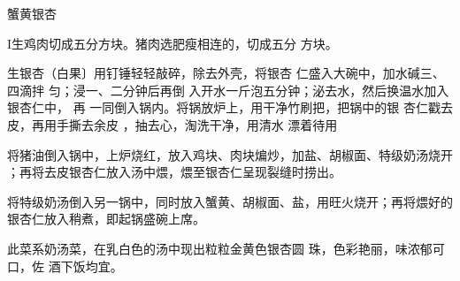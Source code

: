 \begin{recipe}{蟹黄银杏}

\ingredients



\cooking

I生鸡肉切成五分方块。猪肉选肥瘦相连的，切成五分 方块。

生银杏（白果〕用钉锤轻轻敲碎，除去外壳，将银杏 仁盛入大碗中，加水碱三、四滴拌
匀；浸一、二分钟后再倒 入开水一斤泡五分钟；泌去水，然后换温水加入银杏仁中， 再
一同倒入锅内。将锅放炉上，用干净竹刷把，把锅中的银 杏仁戳去皮，再用手撕去余皮
，抽去心，淘洗干净，用清水 漂着待用

\step 将猪油倒入锅中，上炉烧红，放入鸡块、肉块煸炒，加盐、胡椒面、特级奶汤烧开
；再将去皮银杏仁放入汤中煨，煨至银杏仁呈现裂缝时捞出。

\step 将特级奶汤倒入另一锅中，同时放入蟹黄、胡椒面、盐，用旺火烧开；再将煨好的
银杏仁放入稍煮，即起锅盛碗上席。

\features

此菜系奶汤菜，在乳白色的汤中现出粒粒金黄色银杏圆 珠，色彩艳丽，味浓郁可口，佐
酒下饭均宜。

\end{recipe}

